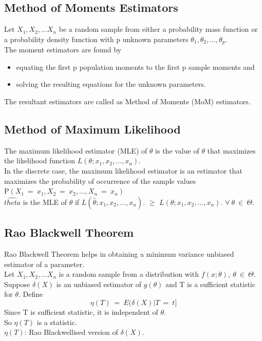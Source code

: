 \subsection*{Method of Moments Estimators}
Let $X_1,X_2,...X_n$ be a random sample from either a probability mass
function or a probability density function with p unknown
parameters $\theta_1,\theta_2,...,\theta_p$.\\
The moment estimators are found by
\begin{itemize}
    \item equating the first p population moments to the first p sample
moments and
    \item solving the resulting equations for the unknown parameters.
\end{itemize}
The resultant estimators are called as Method of Moments (MoM)
estimators.

\subsection*{Method of Maximum Likelihood}
The maximum likelihood estimator (MLE) of $\theta$ is the value of $\theta$ that maximizes the likelihood function $L(\theta;x_1,x_2,...,x_n).$\\
In the discrete case, the maximum likelihood estimator is an estimator
that maximizes the probability of occurrence of the sample values\\
P$(X_1\ =\ x_1, X_2\ =\ x_2,...,X_n\ =\ x_n)$\\
$\hat{theta}$ is the MLE of $\theta$ if $L(\hat{\theta};x_1,x_2,...,x_n).$ $\geq$ $L(\theta;x_1,x_2,...,x_n).$ $\forall \ \theta \ \in \ \Theta$.

\subsection*{Rao Blackwell Theorem}
Rao Blackwell Theorem helps in obtaining a minimum variance
unbiased estimator of a parameter.\\
Let $X_1,X_2,...X_n$ is a random sample from a distribution with $f(x;\theta),\ \theta\ \in\ \Theta$. Suppose $\delta(X)$ is an unbiased estimator of $g(\theta)$ and T is a sufficient statistic for $\theta$. Define
\[ \eta(T)\ =\ E(\delta(X)|T\ =\ t] \]
Since T is sufficient statistic, it is independent of $\theta$.\\
So $\eta(T)$ is a statistic.\\
$\eta(T)$: Rao Blackwellised version of $\delta(X)$.

